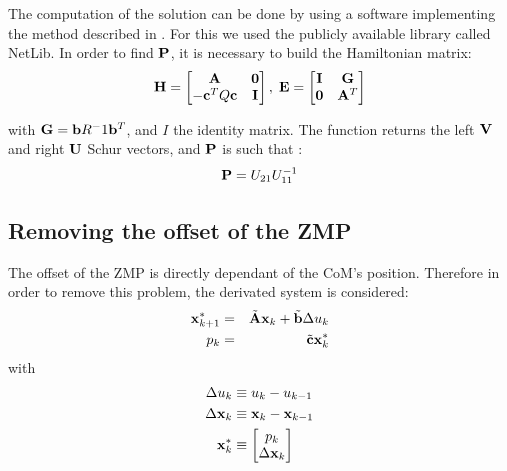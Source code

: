 The computation of the solution can be done by using a software implementing the
method described in \cite{Arnold1984}. For this we used the publicly available
library called NetLib. In order to find ${\bf P}$, it is necessary to build
the Hamiltonian matrix:
\begin{equation}
{\bf H} = 
\left[
\begin{matrix}
{\bf A} & {\bf 0 } \\
-{\bf c}^TQ{\bf c} & {\bf I} \\
\end{matrix}
\right],
\;
{\bf E} = 
\left[
\begin{matrix}
{\bf I} & {\bf G } \\
{\bf 0} & {\bf A}^T \\
\end{matrix}
\right]
\end{equation}

with ${\bf G}= {\bf b} R^-1 {\bf b}^T$, and $I$ the identity matrix.
The function returns the left ${\bf V}$ and right ${\bf U}$ Schur vectors,
and ${\bf P}$ is such that :
\begin{equation}
{\bf P} = U_{21}U_{11}^{-1} 
\end{equation}

\subsection{Removing the offset of the ZMP}
	
The offset of the ZMP is directly dependant of the CoM's position.
Therefore in order to remove this problem, the derivated system is considered:
\begin{equation}
\begin{aligned}
     {\bf x}^*_{k+1} & =& \tilde{\bf A} {\bf x}_k + \tilde{{\bf b}} \Delta u_k \\
     p_k &=& \tilde{\bf c}{\bf x}^*_k\\
\end{aligned}
\end{equation}
with
\begin{equation}
\begin{aligned}
\Delta u_k & \equiv u_k - u_{k-1} \\
\Delta{\bf x}_k & \equiv {\bf x}_k - {\bf x}_{k-1}\\
 {\bf x}^*_k & \equiv 
	\left[ 
	\begin{matrix}
	p_k \\
	\Delta {\bf x}_k \\
	\end{matrix}
	\right] \\
\end{aligned}
\end{equation}



